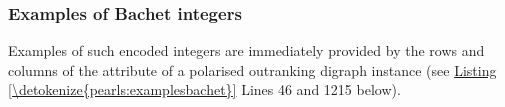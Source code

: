 \documentclass[a4paper,12pt,english]{sphinxhowto}
\begin{document}
\subsubsection{Examples of Bachet integers}
\label{\detokenize{pearls:examples-of-bachet-integers}}
\sphinxAtStartPar
Examples of such  encoded  integers are immediately provided by the rows and columns of the  attribute of a polarised outranking digraph instance (see \hyperref[\detokenize{pearls:examplesbachet}]{Listing \ref{\detokenize{pearls:examplesbachet}}} Lines 4\sphinxhyphen{}6  and 12\sphinxhyphen{}15 below).
\def\sphinxLiteralBlockLabel{\label{\detokenize{pearls:examplesbachet}}}
%
\end{document}
